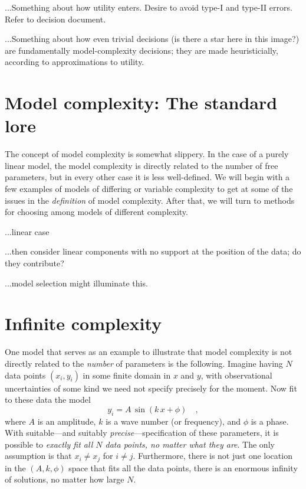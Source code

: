 \documentclass[12pt,twoside]{article}
\begin{document}
...Something about how utility enters.  Desire to avoid type-I and
type-II errors.  Refer to decision document.

...Something about how even trivial decisions (is there a star here in
this image?) are fundamentally model-complexity decisions; they are
made heuristicially, according to approximations to utility.

\section{Model complexity: The standard lore}

The concept of model complexity is somewhat slippery.  In the case of
a purely linear model, the model complexity is directly related to the
number of free parameters, but in every other case it is less
well-defined.  We will begin with a few examples of models of
differing or variable complexity to get at some of the issues in the
\emph{definition} of model complexity.  After that, we will turn to
methods for choosing among models of different complexity.

...linear case

...then consider linear components with no support at the position of the
data; do they contribute?

...model selection might illuminate this.

\section{Infinite complexity}

One model that serves as an example to illustrate that model
complexity is not directly related to the \emph{number} of parameters
is the following.  Imagine having $N$ data points $(x_i,y_i)$ in some finite
domain in $x$ and $y$, with observational uncertainties of some kind
we need not specify precisely for the moment.  Now fit to these data
the model
\begin{equation}\label{eq:lecun}
y_i = A\,\sin (k\,x + \phi)
  \quad ,
\end{equation}
where $A$ is an amplitude, $k$ is a wave number (or frequency), and
$\phi$ is a phase.  With suitable---and suitably
\emph{precise}---specification of these parameters, it is possible to
\emph{exactly fit all $N$ data points, no matter what they are}.  The
only assumption is that $x_i \ne x_j$ for $i \ne j$.  Furthermore,
there is not just one location in the $(A,k,\phi)$ space that fits all
the data points, there is an enormous infinity of solutions, no matter
how large $N$.
\end{document}
